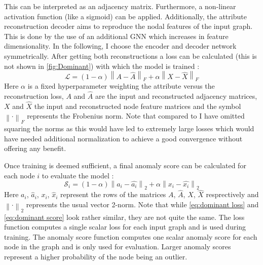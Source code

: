 \documentclass[11pt,a4paper]{article}
\begin{document}
This can be interpreted as an adjacency matrix. 
Furthermore, a non-linear activation function (like a sigmoid) can be applied. 
Additionally, the attribute reconstruction decoder aims to reproduce the nodal features of the input graph. 
This is done by the use of an additional GNN which increases in feature dimensionality. 
In the following, I choose the encoder and decoder network symmetrically. 
After getting both reconstructions a loss can be calculated (this is not shown in \autoref{fig:Dominant}) with which the model is trained \cite{dingDeepAnomalyDetection2019}:
\begin{equation}
\label{eq:dominant loss}
\mathcal{L} = (1-\alpha) \left\lVert A-\hat{A} \right\rVert _F + \alpha \left\lVert X-\hat{X} \right\rVert _F
\end{equation}
Here $\alpha$ is a fixed hyperparameter weighting the attribute versus the reconstruction loss, $A$ and $\hat{A}$ are the input and reconstructed adjacency matrices, $X$ and $\hat{X}$ the input and reconstructed node feature matrices and the symbol $\left\lVert\cdot \right\rVert _F$ represents the Frobenius norm. 
Note that compared to \cite{dingDeepAnomalyDetection2019} I have omitted squaring the norms as this would have led to extremely large losses which would have needed additional normalization to achieve a good convergence without offering any benefit. 

Once training is deemed sufficient, a final anomaly score can be calculated for each node $i$ to evaluate the model \cite{dingDeepAnomalyDetection2019}:
\begin{equation}
\label{eq:dominant score}
\mathcal{S}_i = (1-\alpha) \left\lVert a_i-\hat{a_i} \right\rVert _2 + \alpha \left\lVert x_i-\hat{x_i} \right\rVert _2
\end{equation}
Here $a_i$, $\hat{a}_i$, $x_i$, $\hat{x}_i$ represent the rows of the matrices $A$, $\hat{A}$, $X$, $\hat{X}$ resprectively and $\left\lVert\cdot \right\rVert _2$ represents the usual vector 2-norm. 
Note that while \autoref{eq:dominant loss} and \autoref{eq:dominant score} look rather similar, they are not quite the same. 
The loss function computes a single scalar loss for each input graph and is used during training. 
The anomaly score function computes one scalar anomaly score for each node in the graph and is only used for evaluation. 
Larger anomaly scores represent a higher probability of the node being an outlier. \\
\end{document}

